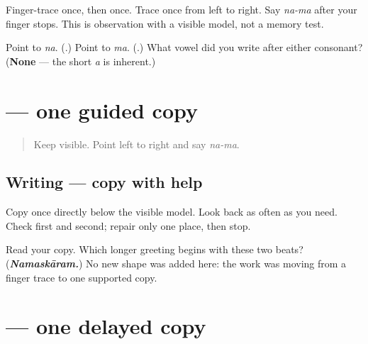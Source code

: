 Finger-trace \textbf{} once, then \textbf{} once. Trace \textbf{} once from left to right. Say \emph{na-ma} after your finger stops. This is observation with a visible model, not a memory test.

\begin{tcolorbox}[breakable,colback=teal!4,colframe=teal!35!black,title={Before you move on}]
Point to \emph{na}. (\textbf{}.) Point to \emph{ma}. (\textbf{}.) What vowel did you write after either consonant? (\textbf{None} — the short \emph{a} is inherent.)
\end{tcolorbox}
\section[\texorpdfstring{\ml{നമ} (na-ma)}{നമ (na-ma)}]{ — one guided copy}

\label{lesson:ML-W01-na-ma-guided-copy}



\begin{quote}
Keep \textbf{} visible. Point left to right and say \emph{na-ma}.
\end{quote}

\subsection*{Writing — copy with help}

Copy \textbf{} once directly below the visible model. Look back as often as you need. Check \textbf{} first and \textbf{} second; repair only one place, then stop.

\begin{tcolorbox}[breakable,colback=teal!4,colframe=teal!35!black,title={Before you move on}]
Read your copy. Which longer greeting begins with these two beats? (\emph{\textbf{Namaskāram.}}) No new shape was added here: the work was moving from a finger trace to one supported copy.
\end{tcolorbox}
\section[\texorpdfstring{\ml{നമ} (na-ma)}{നമ (na-ma)}]{ — one delayed copy}

\label{lesson:ML-W01-na-ma-delayed-copy}



